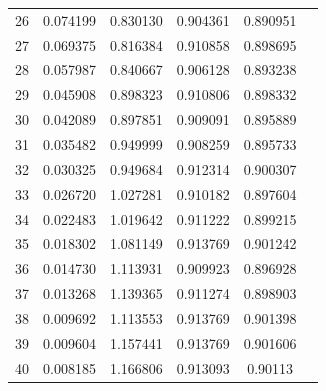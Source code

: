 \begin{table}[ht]
\begin{tabular}{c c c c c c}
26 & 0.074199 & 0.830130 & 0.904361 & 0.890951 \\
27 & 0.069375 & 0.816384 & 0.910858 & 0.898695 \\
28 & 0.057987 & 0.840667 & 0.906128 & 0.893238 \\
29 & 0.045908 & 0.898323 & 0.910806 & 0.898332 \\
30 & 0.042089 & 0.897851 & 0.909091 & 0.895889 \\
31 & 0.035482 & 0.949999 & 0.908259 & 0.895733 \\
32 & 0.030325 & 0.949684 & 0.912314 & 0.900307 \\
33 & 0.026720 & 1.027281 & 0.910182 & 0.897604 \\
34 & 0.022483 & 1.019642 & 0.911222 & 0.899215 \\
35 & 0.018302 & 1.081149 & 0.913769 & 0.901242 \\
36 & 0.014730 & 1.113931 & 0.909923 & 0.896928 \\
37 & 0.013268 & 1.139365 & 0.911274 & 0.898903 \\
38 & 0.009692 & 1.113553 & 0.913769 & 0.901398 \\
39 & 0.009604 & 1.157441 & 0.913769 & 0.901606 \\
40 & 0.008185 & 1.166806 & 0.913093 & 0.90113 \\
\hline
\end{tabular}
\end{table}


